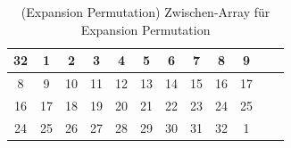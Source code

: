\begin{table}[h]
    \centering
    \begin{tabular}{|*{12}{c|}}
        \hline
        \cellcolor{green-1}32 &
        \cellcolor{red-1}1 & \cellcolor{red-1}2 & \cellcolor{red-1}3 & \cellcolor{red-1}4 & 
        \cellcolor{red-1}5 & \cellcolor{red-1}6 & \cellcolor{red-1}7 & \cellcolor{red-1}8 & \cellcolor{orange-1}9\\
        \hline 
        \cellcolor{red-1}8 &
        \cellcolor{orange-1}9 & \cellcolor{orange-1}10 & \cellcolor{orange-1}11 & \cellcolor{orange-1}12 & 
        \cellcolor{orange-1}13 & \cellcolor{orange-1}14 & \cellcolor{orange-1}15 & \cellcolor{orange-1}16 & \cellcolor{yellow-1}17 \\
        \hline 
        \cellcolor{orange-1}16 &
        \cellcolor{yellow-1}17 & \cellcolor{yellow-1}18 & \cellcolor{yellow-1}19 & \cellcolor{yellow-1}20 & 
        \cellcolor{yellow-1}21 & \cellcolor{yellow-1}22 & \cellcolor{yellow-1}23 & \cellcolor{yellow-1}24 & \cellcolor{green-1}25\\
        \hline
        \cellcolor{yellow-1}24 &
        \cellcolor{green-1}25 & \cellcolor{green-1}26 & \cellcolor{green-1}27 & \cellcolor{green-1}28 &
        \cellcolor{green-1}29 & \cellcolor{green-1}30 & \cellcolor{green-1}31 & \cellcolor{green-1}32 & \cellcolor{red-1}1\\
        \hline 
    \end{tabular}
    \caption{(Expansion Permutation) Zwischen-Array für Expansion Permutation}
\end{table}

